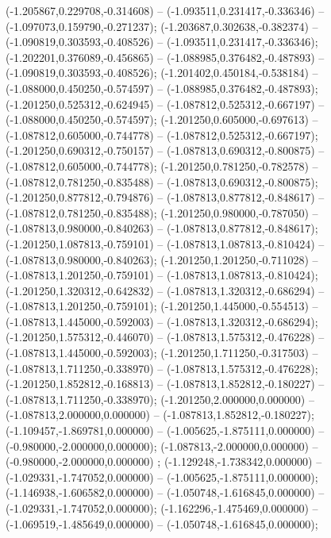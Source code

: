 (-1.205867,0.229708,-0.314608) -- (-1.093511,0.231417,-0.336346) -- (-1.097073,0.159790,-0.271237);
 (-1.203687,0.302638,-0.382374) -- (-1.090819,0.303593,-0.408526) -- (-1.093511,0.231417,-0.336346);
 (-1.202201,0.376089,-0.456865) -- (-1.088985,0.376482,-0.487893) -- (-1.090819,0.303593,-0.408526);
 (-1.201402,0.450184,-0.538184) -- (-1.088000,0.450250,-0.574597) -- (-1.088985,0.376482,-0.487893);
 (-1.201250,0.525312,-0.624945) -- (-1.087812,0.525312,-0.667197) -- (-1.088000,0.450250,-0.574597);
 (-1.201250,0.605000,-0.697613) -- (-1.087812,0.605000,-0.744778) -- (-1.087812,0.525312,-0.667197);
 (-1.201250,0.690312,-0.750157) -- (-1.087813,0.690312,-0.800875) -- (-1.087812,0.605000,-0.744778);
 (-1.201250,0.781250,-0.782578) -- (-1.087812,0.781250,-0.835488) -- (-1.087813,0.690312,-0.800875);
 (-1.201250,0.877812,-0.794876) -- (-1.087813,0.877812,-0.848617) -- (-1.087812,0.781250,-0.835488);
 (-1.201250,0.980000,-0.787050) -- (-1.087813,0.980000,-0.840263) -- (-1.087813,0.877812,-0.848617);
 (-1.201250,1.087813,-0.759101) -- (-1.087813,1.087813,-0.810424) -- (-1.087813,0.980000,-0.840263);
 (-1.201250,1.201250,-0.711028) -- (-1.087813,1.201250,-0.759101) -- (-1.087813,1.087813,-0.810424);
 (-1.201250,1.320312,-0.642832) -- (-1.087813,1.320312,-0.686294) -- (-1.087813,1.201250,-0.759101);
 (-1.201250,1.445000,-0.554513) -- (-1.087813,1.445000,-0.592003) -- (-1.087813,1.320312,-0.686294);
 (-1.201250,1.575312,-0.446070) -- (-1.087813,1.575312,-0.476228) -- (-1.087813,1.445000,-0.592003);
 (-1.201250,1.711250,-0.317503) -- (-1.087813,1.711250,-0.338970) -- (-1.087813,1.575312,-0.476228);
 (-1.201250,1.852812,-0.168813) -- (-1.087813,1.852812,-0.180227) -- (-1.087813,1.711250,-0.338970);
 (-1.201250,2.000000,0.000000) -- (-1.087813,2.000000,0.000000) -- (-1.087813,1.852812,-0.180227);
 (-1.109457,-1.869781,0.000000) -- (-1.005625,-1.875111,0.000000) -- (-0.980000,-2.000000,0.000000);
 (-1.087813,-2.000000,0.000000) -- (-0.980000,-2.000000,0.000000) ;
 (-1.129248,-1.738342,0.000000) -- (-1.029331,-1.747052,0.000000) -- (-1.005625,-1.875111,0.000000);
 (-1.146938,-1.606582,0.000000) -- (-1.050748,-1.616845,0.000000) -- (-1.029331,-1.747052,0.000000);
 (-1.162296,-1.475469,0.000000) -- (-1.069519,-1.485649,0.000000) -- (-1.050748,-1.616845,0.000000);
